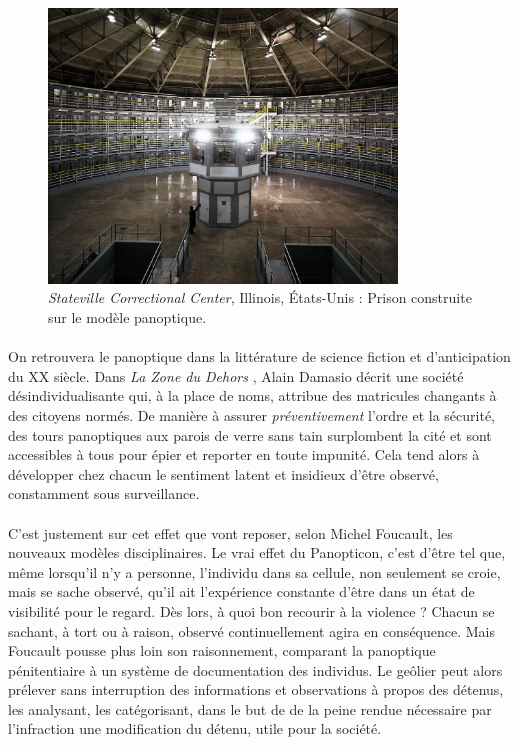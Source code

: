 \begin{figure}[ht]
    \centering
    \includegraphics[width=350px]{chapters/01/images/panoptique.jpg}
    \caption{\label{panoptique}\emph{Stateville Correctional Center}, Illinois, États-Unis : Prison construite sur le modèle panoptique.}
\end{figure}

\paragraph{} On retrouvera le panoptique dans la littérature de science fiction et d'anticipation du XX siècle.
Dans \emph{La Zone du Dehors} \cite{Damasio0}, Alain Damasio décrit une société désindividualisante qui, à la place
de noms, attribue des matricules changants à des citoyens normés. De manière à assurer \emph{préventivement} l'ordre et la
sécurité, des tours panoptiques aux parois de verre sans tain surplombent la cité et sont accessibles à tous pour épier
et reporter en toute impunité. Cela tend alors à développer chez chacun le sentiment latent et insidieux d'être observé, 
constamment sous surveillance.

\paragraph{} C'est justement sur cet effet que vont reposer, selon Michel Foucault, les nouveaux modèles disciplinaires.
\guillemotleft Le vrai effet du Panopticon, c'est d'être tel que, même lorsqu'il n'y a personne, l'individu dans sa
cellule, non seulement se croie, mais se sache observé, qu'il ait l'expérience constante d'être dans un état de visibilité
pour le regard\guillemotright. \cite{Foucault0} Dès lors, à quoi bon recourir à la violence ? Chacun se sachant, à tort
ou à raison, observé continuellement agira en conséquence. Mais Foucault pousse plus loin son raisonnement, comparant la
panoptique pénitentiaire à un système de documentation des individus. Le geôlier peut alors prélever sans interruption
des informations et observations à propos des détenus, les analysant, les catégorisant, dans le but de \guillemotleft 
[Faire] de la peine rendue nécessaire par l'infraction une modification du détenu, utile pour la société.\guillemotright

